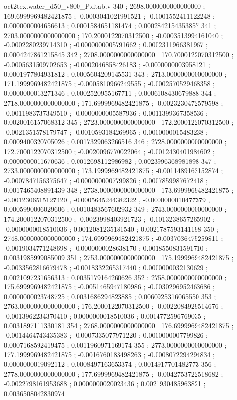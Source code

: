 \begin{filecontents}[overwrite]{oct2tex.water_d50_v800_P.dtab.v}
340 ; 2698.0000000000000000 ; 169.6999969482421875 ; -0.0003041021991521 ; -0.0001552411122248 ; 0.0000000004656613 ; 0.0001584651181474 ; 0.0002842154353857
341 ; 2703.0000000000000000 ; 170.2000122070312500 ; -0.0003513994161040 ; -0.0002280239714310 ; -0.0000000005791662 ; 0.0002311966381967 ; 0.0004247861215845
342 ; 2708.0000000000000000 ; 170.7000122070312500 ; -0.0005631509702653 ; -0.0002046858426183 ; -0.0000000003958121 ; 0.0001977804931812 ; 0.0005604209145531
343 ; 2713.0000000000000000 ; 171.1999969482421875 ; -0.0005810966249555 ; -0.0002570529468358 ; 0.0000000013271346 ; 0.0002520955167711 ; 0.0006108430679888
344 ; 2718.0000000000000000 ; 171.6999969482421875 ; -0.0023230472579598 ; -0.0011983737349510 ; -0.0000000005587936 ; 0.0011399367358536 ; 0.0020016157068312
345 ; 2723.0000000000000000 ; 172.2000122070312500 ; -0.0021351578179747 ; -0.0010593184269965 ; 0.0000000015483238 ; 0.0009400320705026 ; 0.0017329063266516
346 ; 2728.0000000000000000 ; 172.7000122070312500 ; -0.0020096770022064 ; -0.0012430401984602 ; 0.0000000011670636 ; 0.0012698112986982 ; 0.0023996368981898
347 ; 2733.0000000000000000 ; 173.1999969482421875 ; -0.0011489163152874 ; -0.0007847156375647 ; -0.0000000007799826 ; 0.0007859987672418 ; 0.0017465408891439
348 ; 2738.0000000000000000 ; 173.6999969482421875 ; -0.0012306515127420 ; -0.0005645244382322 ; -0.0000000010477379 ; 0.0005990006029606 ; 0.0010483567602932
349 ; 2743.0000000000000000 ; 174.2000122070312500 ; -0.0023998403921723 ; -0.0013238657265902 ; -0.0000000018510036 ; 0.0012081235181540 ; 0.0021787593141198
350 ; 2748.0000000000000000 ; 174.6999969482421875 ; -0.0037036475259811 ; -0.0019034771248698 ; -0.0000000028638170 ; 0.0018550831591710 ; 0.0031985999085009
351 ; 2753.0000000000000000 ; 175.1999969482421875 ; -0.0033562816679478 ; -0.0018332265317440 ; 0.0000000032130629 ; 0.0021097231656313 ; 0.0035179164260626
352 ; 2758.0000000000000000 ; 175.6999969482421875 ; -0.0051465947180986 ; -0.0030296952463686 ; 0.0000000023748725 ; 0.0031686294823885 ; 0.0060925316065550
353 ; 2763.0000000000000000 ; 176.2000122070312500 ; -0.0022084929514676 ; -0.0013962234370410 ; 0.0000000018510036 ; 0.0014772596769035 ; 0.0031897111330181
354 ; 2768.0000000000000000 ; 176.6999969482421875 ; -0.0014464743435383 ; -0.0007335077971220 ; 0.0000000007799826 ; 0.0007168592419475 ; 0.0011960971169174
355 ; 2773.0000000000000000 ; 177.1999969482421875 ; -0.0016760183498263 ; -0.0008072294294834 ; 0.0000000019092112 ; 0.0008497163653374 ; 0.0014917701482773
356 ; 2778.0000000000000000 ; 177.6999969482421875 ; -0.0042753722518682 ; -0.0022798161953688 ; 0.0000000020023436 ; 0.0021930485963821 ; 0.0036508042830974

\end{filecontents}

